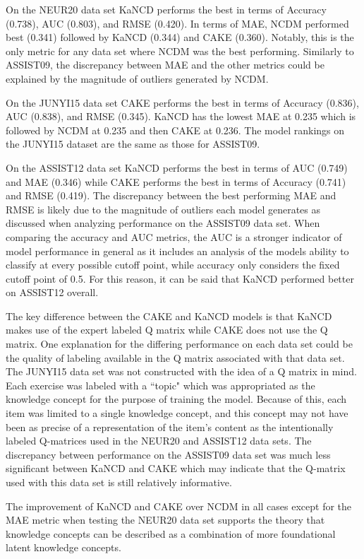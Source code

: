 \documentclass[letterpaper, 12pt, captions=tableabove]{scrreprt}
\begin{document}
On the NEUR20 data set KaNCD performs the best in terms of Accuracy (0.738), AUC (0.803), and RMSE (0.420). In terms of MAE, NCDM performed best (0.341) followed by KaNCD (0.344) and CAKE (0.360). Notably, this is the only metric for any data set where NCDM was the best performing. Similarly to ASSIST09, the discrepancy between MAE and the other metrics could be explained by the magnitude of outliers generated by NCDM.

On the JUNYI15 data set CAKE performs the best in terms of Accuracy (0.836), AUC (0.838), and RMSE (0.345). KaNCD has the lowest MAE at 0.235 which is followed by NCDM at 0.235 and then CAKE at 0.236. The model rankings on the JUNYI15 dataset are the same as those for ASSIST09.

On the ASSIST12 data set KaNCD performs the best in terms of AUC (0.749) and MAE (0.346) while CAKE performs the best in terms of Accuracy (0.741) and RMSE (0.419). The discrepancy between the best performing MAE and RMSE is likely due to the magnitude of outliers each model generates as discussed when analyzing performance on the ASSIST09 data set. When comparing the accuracy and AUC metrics, the AUC is a stronger indicator of model performance in general as it includes an analysis of the models ability to classify at every possible cutoff point, while accuracy only considers the fixed cutoff point of 0.5. For this reason, it can be said that KaNCD performed better on ASSIST12 overall.

The key difference between the CAKE and KaNCD models is that KaNCD makes use of the expert labeled Q matrix while CAKE does not use the Q matrix. One explanation for the differing performance on each data set could be the quality of labeling available in the Q matrix associated with that data set. The JUNYI15 data set was not constructed with the idea of a Q matrix in mind. Each exercise was labeled with a ``topic" which was appropriated as the knowledge concept for the purpose of training the model. Because of this, each item was limited to a single knowledge concept, and this concept may not have been as precise of a representation of the item's content as the intentionally labeled Q-matrices used in the NEUR20 and ASSIST12 data sets. The discrepancy between performance on the ASSIST09 data set was much less significant between KaNCD and CAKE which may indicate that the Q-matrix used with this data set is still relatively informative.
		
The improvement of KaNCD and CAKE over NCDM in all cases except for the MAE metric when testing the NEUR20 data set supports the theory that knowledge concepts can be described as a combination of more foundational latent knowledge concepts.
\end{document}
